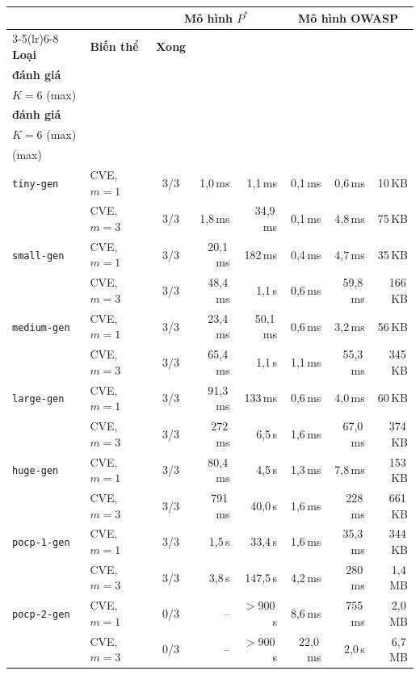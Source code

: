 \documentclass[11pt,a4paper]{article}
\begin{document}
\begin{center}
\footnotesize
\begin{tabular}{@{}ll c rr rrr@{}}
\toprule
& & \multicolumn{3}{c}{\textbf{Mô hình $P^{*}$}} & \multicolumn{3}{c}{\textbf{Mô hình OWASP}} \\
\cmidrule(lr){3-5}\cmidrule(lr){6-8}
\textbf{Loại} & \textbf{Biến thể} & \textbf{Xong} & \shortstack{\textbf{1 lần}\\\textbf{đánh giá}} & \shortstack{\textbf{Ngữ cảnh}\\$K{=}6$ (max)} & \shortstack{\textbf{1 lần}\\\textbf{đánh giá}} & \shortstack{\textbf{Ngữ cảnh}\\$K{=}6$ (max)} & \shortstack{\textbf{Bộ nhớ}\\(max)} \\
\midrule
\texttt{tiny-gen} & CVE, $m{=}1$ & 3/3 & 1{,}0\,ms & 1{,}1\,ms & 0{,}1\,ms & 0{,}6\,ms & 10\,KB \\
 & CVE, $m{=}3$ & 3/3 & 1{,}8\,ms & 34{,}9\,ms & 0{,}1\,ms & 4{,}8\,ms & 75\,KB \\
\texttt{small-gen} & CVE, $m{=}1$ & 3/3 & 20{,}1\,ms & 182\,ms & 0{,}4\,ms & 4{,}7\,ms & 35\,KB \\
 & CVE, $m{=}3$ & 3/3 & 48{,}4\,ms & 1{,}1\,s & 0{,}6\,ms & 59{,}8\,ms & 166\,KB \\
\texttt{medium-gen} & CVE, $m{=}1$ & 3/3 & 23{,}4\,ms & 50{,}1\,ms & 0{,}6\,ms & 3{,}2\,ms & 56\,KB \\
 & CVE, $m{=}3$ & 3/3 & 65{,}4\,ms & 1{,}1\,s & 1{,}1\,ms & 55{,}3\,ms & 345\,KB \\
\texttt{large-gen} & CVE, $m{=}1$ & 3/3 & 91{,}3\,ms & 133\,ms & 0{,}6\,ms & 4{,}0\,ms & 60\,KB \\
 & CVE, $m{=}3$ & 3/3 & 272\,ms & 6{,}5\,s & 1{,}6\,ms & 67{,}0\,ms & 374\,KB \\
\texttt{huge-gen} & CVE, $m{=}1$ & 3/3 & 80{,}4\,ms & 4{,}5\,s & 1{,}3\,ms & 7{,}8\,ms & 153\,KB \\
 & CVE, $m{=}3$ & 3/3 & 791\,ms & 40{,}0\,s & 1{,}6\,ms & 228\,ms & 661\,KB \\
\texttt{pocp-1-gen} & CVE, $m{=}1$ & 3/3 & 1{,}5\,s & 33{,}4\,s & 1{,}6\,ms & 35{,}3\,ms & 344\,KB \\
 & CVE, $m{=}3$ & 3/3 & 3{,}8\,s & 147{,}5\,s & 4{,}2\,ms & 280\,ms & 1{,}4\,MB \\
\texttt{pocp-2-gen} & CVE, $m{=}1$ & 0/3 & -- & $>$900\,s & 8{,}6\,ms & 755\,ms & 2{,}0\,MB \\
 & CVE, $m{=}3$ & 0/3 & -- & $>$900\,s & 22{,}0\,ms & 2{,}0\,s & 6{,}7\,MB \\
\bottomrule
\end{tabular}
\end{center}
\end{document}
